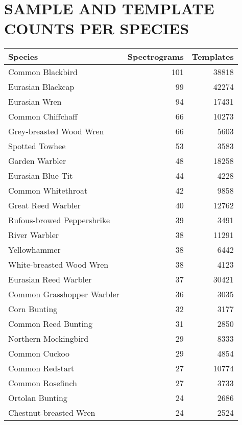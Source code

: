 \chapter{SAMPLE AND TEMPLATE COUNTS PER SPECIES} \label{app:samples}

  \begin{longtable}{l r r}
Species                         &Spectrograms &Templates \\ \hline
Common Blackbird                &101  &38818 \\
Eurasian Blackcap               &99   &42274 \\
Eurasian Wren                   &94   &17431 \\
Common Chiffchaff               &66   &10273 \\
Grey-breasted Wood Wren         &66   &5603  \\
Spotted Towhee                  &53   &3583  \\
Garden Warbler                  &48   &18258 \\
Eurasian Blue Tit               &44   &4228  \\
Common Whitethroat              &42   &9858  \\
Great Reed Warbler              &40   &12762 \\
Rufous-browed Peppershrike      &39   &3491  \\
River Warbler                   &38   &11291 \\
Yellowhammer                    &38   &6442  \\
White-breasted Wood Wren        &38   &4123  \\
Eurasian Reed Warbler           &37   &30421 \\
Common Grasshopper Warbler      &36   &3035  \\
Corn Bunting                    &32   &3177  \\
Common Reed Bunting             &31   &2850  \\
Northern Mockingbird            &29   &8333  \\
Common Cuckoo                   &29   &4854  \\
Common Redstart                 &27   &10774 \\
Common Rosefinch                &27   &3733  \\
Ortolan Bunting                 &24   &2686  \\
Chestnut-breasted Wren          &24   &2524  \\

\end{longtable}
